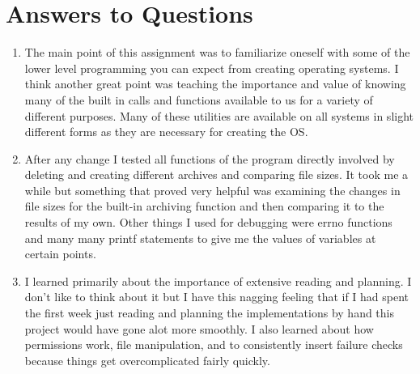 \documentclass[letterpaper,10pt]{article}
\begin{document}
\section{Answers to Questions}
\begin{enumerate}
    \item
	The main point of this assignment was to familiarize oneself with some of the lower level programming you can expect from creating operating systems. I think another great point was teaching the importance and value
of knowing many of the built in calls and functions available to us for a variety of different purposes. Many of these utilities are available on all systems in slight different forms as they are necessary for creating the OS.
	\item 
	After any change I tested all functions of the program directly involved by deleting and creating different archives and comparing file sizes. It took me a while but something that proved very helpful was examining the changes in file sizes
for the built-in archiving function and then comparing it to the results of my own. Other things I used for debugging were errno functions and many many printf statements to give me the values of variables at certain points.
	\item
	I learned primarily about the importance of extensive reading and planning. I don't like to think about it but I have this nagging feeling that if I had spent the first week just reading and planning the implementations by hand
this project would have gone alot more smoothly. I also learned about how permissions work, file manipulation, and to consistently insert failure checks because things get overcomplicated fairly quickly.	
    
\end{enumerate}
\end{document}
